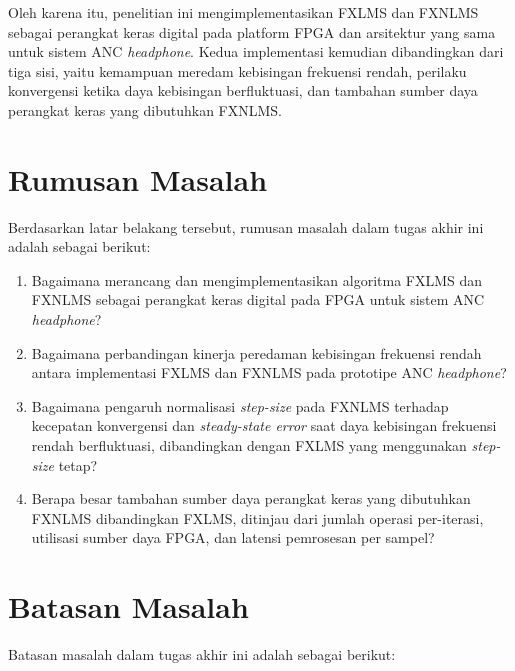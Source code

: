 Oleh karena itu, penelitian ini mengimplementasikan FXLMS dan FXNLMS sebagai perangkat keras digital pada platform FPGA dan arsitektur yang sama untuk sistem ANC \emph{headphone}. Kedua implementasi kemudian dibandingkan dari tiga sisi, yaitu kemampuan meredam kebisingan frekuensi rendah, perilaku konvergensi ketika daya kebisingan berfluktuasi, dan tambahan sumber daya perangkat keras yang dibutuhkan FXNLMS.

\section{Rumusan Masalah}
\label{sec:rumusanmasalah}

Berdasarkan latar belakang tersebut, rumusan masalah dalam tugas akhir ini adalah sebagai berikut:

\begin{enumerate}
  \item Bagaimana merancang dan mengimplementasikan algoritma FXLMS dan FXNLMS sebagai perangkat keras digital pada FPGA untuk sistem ANC \emph{headphone}?
  \item Bagaimana perbandingan kinerja peredaman kebisingan frekuensi rendah antara implementasi FXLMS dan FXNLMS pada prototipe ANC \emph{headphone}?
  \item Bagaimana pengaruh normalisasi \emph{step-size} pada FXNLMS terhadap kecepatan konvergensi dan \emph{steady-state error} saat daya kebisingan frekuensi rendah berfluktuasi, dibandingkan dengan FXLMS yang menggunakan \emph{step-size} tetap?
  \item Berapa besar tambahan sumber daya perangkat keras yang dibutuhkan FXNLMS dibandingkan FXLMS, ditinjau dari jumlah operasi per-iterasi, utilisasi sumber daya FPGA, dan latensi pemrosesan per sampel?
\end{enumerate}

\section{Batasan Masalah}
\label{sec:batasanmasalah}

Batasan masalah dalam tugas akhir ini adalah sebagai berikut:

